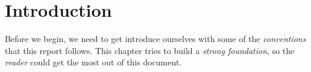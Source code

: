 \documentclass[../../main]{subfiles}
\begin{document}
\section{Introduction} \label{sec:}

Before we begin, we need to get introduce ourselves with some of the \emph{conventions} that this
report follows. This chapter tries to build a \emph{strong foundation}, so the \emph{reader} could
get the most out of this document.


\end{document}
